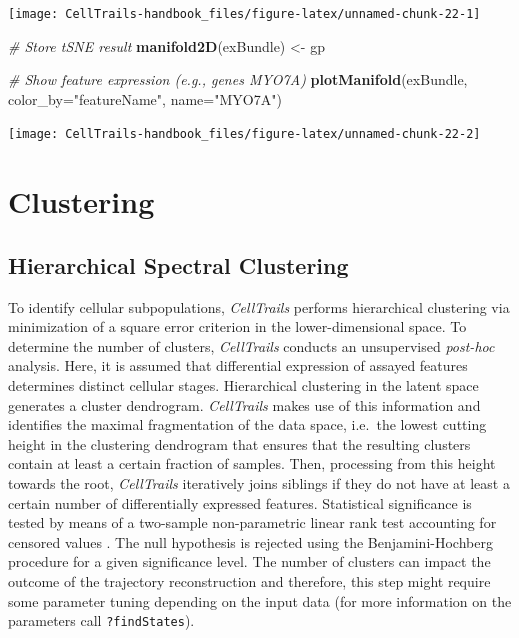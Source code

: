 \documentclass[]{book}
\newenvironment{Shaded}{\begin{snugshade}}{\end{snugshade}}
\newcommand{\KeywordTok}[1]{\textcolor[rgb]{0.13,0.29,0.53}{\textbf{#1}}}
\newcommand{\DataTypeTok}[1]{\textcolor[rgb]{0.13,0.29,0.53}{#1}}
\newcommand{\StringTok}[1]{\textcolor[rgb]{0.31,0.60,0.02}{#1}}
\newcommand{\CommentTok}[1]{\textcolor[rgb]{0.56,0.35,0.01}{\textit{#1}}}
\newcommand{\NormalTok}[1]{#1}
\theoremstyle{definition}
\theoremstyle{definition}
\theoremstyle{definition}
\theoremstyle{remark}
\begin{document}
\texttt{[image: CellTrails-handbook\_files/figure-latex/unnamed-chunk-22-1]}

\begin{Shaded}
\begin{Highlighting}[]
\CommentTok{# Store tSNE result}
\KeywordTok{manifold2D}\NormalTok{(exBundle) <-}\StringTok{ }\NormalTok{gp}

\CommentTok{# Show feature expression (e.g., genes MYO7A)}
\KeywordTok{plotManifold}\NormalTok{(exBundle, }\DataTypeTok{color_by=}\StringTok{"featureName"}\NormalTok{, }\DataTypeTok{name=}\StringTok{"MYO7A"}\NormalTok{)}
\end{Highlighting}
\end{Shaded}

\texttt{[image: CellTrails-handbook\_files/figure-latex/unnamed-chunk-22-2]}

\chapter{Clustering}\label{clustering}

\section{Hierarchical Spectral
Clustering}\label{hierarchical-spectral-clustering}

To identify cellular subpopulations, \emph{CellTrails} performs
hierarchical clustering via minimization of a square error criterion
\citep{ward1963} in the lower-dimensional space. To determine the number
of clusters, \emph{CellTrails} conducts an unsupervised \emph{post-hoc}
analysis. Here, it is assumed that differential expression of assayed
features determines distinct cellular stages. Hierarchical clustering in
the latent space generates a cluster dendrogram. \emph{CellTrails} makes
use of this information and identifies the maximal fragmentation of the
data space, i.e.~the lowest cutting height in the clustering dendrogram
that ensures that the resulting clusters contain at least a certain
fraction of samples. Then, processing from this height towards the root,
\emph{CellTrails} iteratively joins siblings if they do not have at
least a certain number of differentially expressed features. Statistical
significance is tested by means of a two-sample non-parametric linear
rank test accounting for censored values \citep{peto1972}. The null
hypothesis is rejected using the Benjamini-Hochberg
\citep{benjamini1995} procedure for a given significance level. The
number of clusters can impact the outcome of the trajectory
reconstruction and therefore, this step might require some parameter
tuning depending on the input data (for more information on the
parameters call \texttt{?findStates}).
\end{document}
